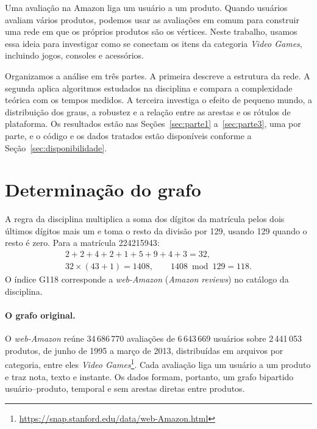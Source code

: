 \documentclass[sigconf,nonacm]{webmedia}
\begin{document}
Uma avaliação na Amazon liga um usuário a um produto. Quando usuários
avaliam vários produtos, podemos usar as avaliações em comum para
construir uma rede em que os próprios produtos são os vértices. Neste
trabalho, usamos essa ideia para investigar como se conectam os itens da
categoria \emph{Video Games}, incluindo jogos, consoles e acessórios.

Organizamos a análise em três partes. A primeira descreve a estrutura
da rede. A segunda aplica algoritmos estudados na disciplina e compara
a complexidade teórica com os tempos medidos. A terceira investiga o
efeito de pequeno mundo, a distribuição dos graus, a robustez e a
relação entre as arestas e os rótulos de plataforma. Os resultados
estão nas Seções~\ref{sec:parte1} a~\ref{sec:parte3}, uma por parte,
e o código e os dados tratados estão disponíveis conforme a
Seção~\ref{sec:disponibilidade}.

\section{Determinação do grafo}
\label{sec:determinacao}

A regra da disciplina multiplica a soma dos dígitos da matrícula
pelos dois últimos dígitos mais um e toma o resto da divisão por 129,
usando 129 quando o resto é zero. Para a matrícula 224215943:
\begin{gather*}
  2+2+4+2+1+5+9+4+3=32,\\
  32\times(43+1)=1408,\qquad 1408\bmod 129=118.
\end{gather*}
O índice G118 corresponde a \emph{web-Amazon}
(\emph{Amazon reviews}) no catálogo da disciplina.

\paragraph{O grafo original.}
O \emph{web-Amazon} reúne 34\,686\,770 avaliações de 6\,643\,669
usuários sobre 2\,441\,053 produtos, de junho de 1995 a março de 2013,
distribuídas em arquivos por categoria, entre eles \emph{Video Games}\footnote{\url{https://snap.stanford.edu/data/web-Amazon.html}}. Cada avaliação liga um usuário a um produto e traz
nota, texto e instante. Os dados formam, portanto, um grafo bipartido
usuário--produto, temporal e sem arestas diretas entre produtos.
\end{document}
